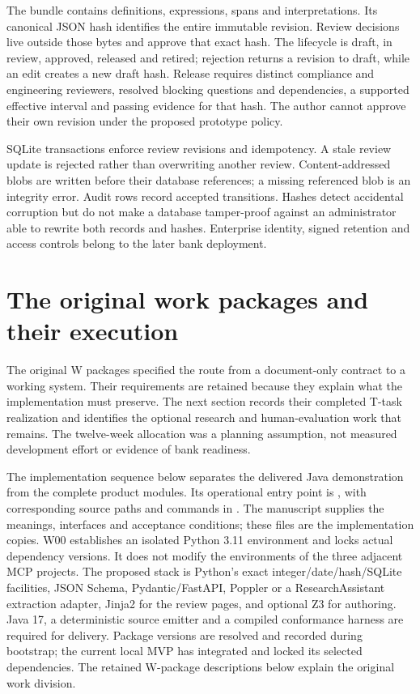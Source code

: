 The bundle contains definitions, expressions, spans and interpretations. Its
canonical JSON hash identifies the entire immutable revision. Review decisions
live outside those bytes and approve that exact hash. The lifecycle is draft,
in review, approved, released and retired; rejection returns a revision to draft,
while an edit creates a new draft hash. Release requires distinct compliance and
engineering reviewers, resolved blocking questions and dependencies, a supported
effective interval and passing evidence for that hash. The author cannot approve
their own revision under the proposed prototype policy.

SQLite transactions enforce review revisions and idempotency. A stale review
update is rejected rather than overwriting another review. Content-addressed
blobs are written before their database references; a missing referenced blob
is an integrity error. Audit rows record accepted transitions. Hashes detect
accidental corruption but do not make a database tamper-proof against an
administrator able to rewrite both records and hashes. Enterprise identity,
signed retention and access controls belong to the later bank deployment.

\section{The original work packages and their execution}

The original W packages specified the route from a document-only contract to
a working system. Their requirements are retained because they explain what the
implementation must preserve. The next section records their completed T-task
realization and identifies the optional research and human-evaluation work that
remains. The twelve-week allocation was a planning assumption, not measured
development effort or evidence of bank readiness.


\label{merge:P-04-prototype:02}


The implementation sequence below separates the delivered Java demonstration
from the complete product modules. Its operational entry point is
, with corresponding source paths and
commands in . The manuscript supplies the meanings,
interfaces and acceptance conditions; these files are the implementation copies.
W00 establishes an isolated
Python 3.11 environment and locks actual dependency versions. It does not modify
the environments of the three adjacent MCP projects. The proposed stack is
Python's exact integer/date/hash/SQLite facilities, JSON Schema, Pydantic/FastAPI,
Poppler or a ResearchAssistant extraction adapter, Jinja2 for the review pages,
and optional Z3 for authoring. Java 17, a deterministic source emitter and a
compiled conformance harness are required for delivery. Package versions are resolved and recorded during bootstrap;
the current local MVP has integrated and locked its selected dependencies.
The retained W-package descriptions below explain the original work division.

